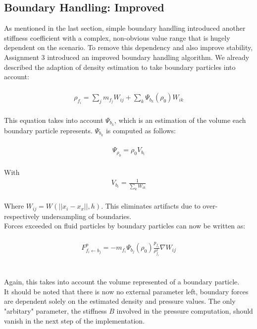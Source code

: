 \documentclass{ACGSeminar}
\begin{document}
\subsection{Boundary Handling: Improved}

As mentioned in the last section, simple boundary handling introduced another stiffness coefficient with a complex, non-obvious value range that is hugely dependent on the scenario. To remove this dependency and also improve stability, Assignment 3 introduced an improved boundary handling algorithm. We already described the adaption of density estimation to take boundary particles into account:\\
\\
\begin{equation} 
\begin{aligned}
\rho_{f_{i}} = \sum_{j}m_{f_{j}}W_{ij} + \sum_{k}\Psi_{b_{k}}(\rho_{0})W_{ik}
\end{aligned}
\end{equation}
\\
This equation takes into account \(\Psi_{b_{k}}\), which is an estimation of the volume each boundary particle represents.
\(\Psi_{b_{k}}\) is computed as follows:\\
\\
\begin{equation} 
\begin{aligned}
\Psi_{\rho_{0}} = \rho_{0}V_{b_{i}}
\end{aligned}
\end{equation}
\\
With 
\begin{equation} 
\begin{aligned}
V_{b_{i}} = \frac{1}{\sum_{k}W_{ik}} 
\end{aligned}
\end{equation}\\
Where \(W_{ij} = W(||x_{i} - x_{x}||, h)\).
This eliminates artifacts due to over- respectively undersampling of boundaries.\\
Forces exceeded on fluid particles by boundary particles can now be written as:\\
\\
\begin{equation} 
\begin{aligned}
F^{p}_{f_{i} \leftarrow b_{j}} = -m_{f_{i}}\Psi_{b_{j}}(\rho_{0})\frac{p_{f_{i}}}{\rho^{2}_{f_{i}}}\nabla W_{ij}
\end{aligned}
\end{equation}\\
\\
Again, this takes into account the volume represented of a boundary particle.\\
It should be noted that there is now no external parameter left, boundary forces are dependent solely on the estimated density and pressure values. The only "arbitary" parameter, the stiffness \(B\) involved in the pressure computation, should vanish in the next step of the implementation.\\
\end{document}
